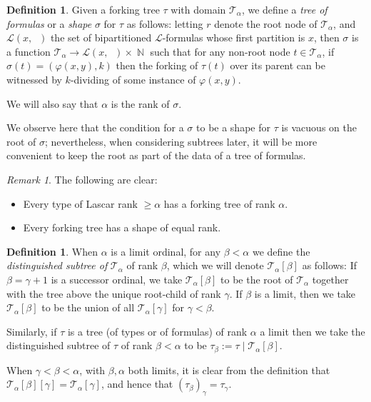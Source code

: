 \documentclass{article}
\DeclareMathOperator{\N}{\mathbb{N}}
\DeclareMathOperator{\blank}{\underline{\enspace}}
\theoremstyle{remark}
\newtheorem{remark}[theorem]{Remark}
\theoremstyle{definition}
\newtheorem{definition}[theorem]{Definition}
\begin{document}
\begin{definition}
    Given a forking tree $\tau$ with domain $\mathcal{T}_\alpha$, we define a \textit{tree of formulas} or a \textit{shape} $\sigma$ for $\tau$ as follows: letting $r$ denote the root node of $\mathcal{T}_\alpha$, and $\mathcal{L}(x,\blank)$ the set of bipartitioned $\mathcal{L}$-formulas whose first partition is $x$, then $\sigma$ is a function $\mathcal{T}_\alpha\to \mathcal{L}(x, \blank)\times\N$ such that for any non-root node $t\in\mathcal{T}_\alpha$, if $\sigma(t)=(\varphi(x,y),k)$ then the forking of $\tau(t)$ over its parent can be witnessed by $k$-dividing of some instance of $\varphi(x,y)$.

    We will also say that $\alpha$ is the rank of $\sigma$.
\end{definition}
We observe here that the condition for a $\sigma$ to be a shape for $\tau$ is vacuous on the root of $\sigma$; nevertheless, when considering subtrees later, it will be more convenient to keep the root as part of the data of a tree of formulas.

\begin{remark}
    The following are clear:
    \begin{itemize}
        \item Every type of Lascar rank $\geq \alpha$ has a forking tree of rank $\alpha$.
        \item Every forking tree has a shape of equal rank.
    \end{itemize}
\end{remark}

\begin{definition}
    When $\alpha$ is a limit ordinal, for any $\beta<\alpha$ we define the \textit{distinguished subtree of }$\mathcal{T}_\alpha$ of rank $\beta$, which we will denote $\mathcal{T}_\alpha[\beta]$ as follows: If $\beta=\gamma+1$ is a successor ordinal, we take $\mathcal{T}_\alpha[\beta]$ to be the root of $\mathcal{T}_\alpha$ together with the tree above the unique root-child of rank $\gamma$. If $\beta$ is a limit, then we take $\mathcal{T}_\alpha[\beta]$ to be the union of all $\mathcal{T}_\alpha[\gamma]$ for $\gamma<\beta$.
\end{definition}

Similarly, if $\tau$ is a tree (of types or of formulas) of rank $\alpha$ a limit then we take the distinguished subtree of $\tau$ of rank $\beta<\alpha$ to be $\tau_\beta:=\tau\mid \mathcal{T}_\alpha[\beta]$.

When $\gamma<\beta<\alpha$, with $\beta,\alpha$ both limits, it is clear from the definition that $\mathcal{T}_\alpha[\beta][\gamma]=\mathcal{T}_\alpha[\gamma]$, and hence that $(\tau_\beta)_\gamma=\tau_\gamma$.
\end{document}
